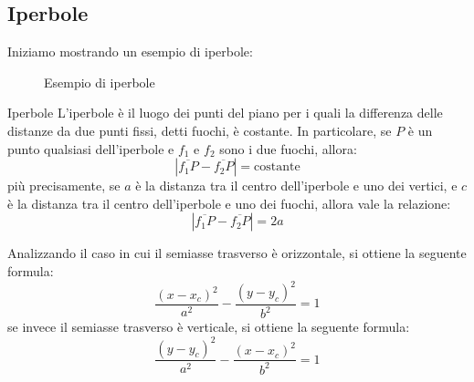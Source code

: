 \subsection{Iperbole}
Iniziamo mostrando un esempio di iperbole:
\begin{figure}[H]
	\caption{Esempio di iperbole}
	\label{fig:iperbole}
\end{figure}
\begin{definizione}{Iperbole}
	L'iperbole è il luogo dei punti del piano per i quali la differenza delle distanze da due punti fissi, detti fuochi, è costante. In particolare, se $ P $ è un punto qualsiasi dell'iperbole e $ f_1 $ e $ f_2 $ sono i due fuochi, allora:
	\[
		\left|\overline{f_1P} - \overline{f_2P}\right| = \text{costante}
	\]
	più precisamente, se $ a $ è la distanza tra il centro dell'iperbole e uno dei vertici, e $ c $ è la distanza tra il centro dell'iperbole e uno dei fuochi, allora vale la relazione:
	\[
		\left|\overline{f_1P} - \overline{f_2P}\right| = 2a
	\]
\end{definizione}
Analizzando il caso in cui il semiasse trasverso è orizzontale, si ottiene la seguente formula:
\[
	\frac{\left(x - x_c\right)^2 }{a^2} - \frac{\left(y - y_c\right)^2 }{b^2} = 1
\]
se invece il semiasse trasverso è verticale, si ottiene la seguente formula:
\[
	\frac{\left(y - y_c\right)^2 }{a^2} - \frac{\left(x - x_c\right)^2 }{b^2} = 1
\]

